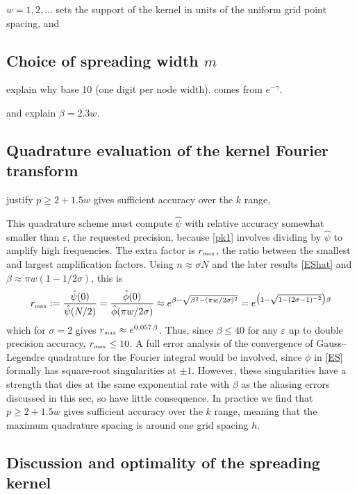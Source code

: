 \documentclass[10pt]{article}
\newcommand{\tbox}[1]{{\mbox{\tiny #1}}}
\newcommand{\eps}{\varepsilon}
\newcommand{\freq}{\beta}          %
\newcommand{\rat}{\sigma}          %
\newcommand{\rmax}{r_\tbox{max}}    %
\begin{document}
$w=1,2,\ldots$
sets the support of the kernel in units of the uniform grid point spacing, and


\subsection{Choice of spreading width $m$}
\label{s:w}

explain why base 10 (one digit per node width).
comes from $e^{-\gamma}$.

and explain $\beta = 2.3 w$.


\subsection{Quadrature evaluation of the kernel Fourier transform}
\label{s:p}

justify  $p\ge 2+1.5 w$ gives sufficient accuracy
over the $k$ range,

This quadrature scheme must compute $\hat\psi$
with relative accuracy
somewhat smaller than $\eps$, the requested precision,
because \eqref{pk1} involves dividing by $\hat\psi$ to amplify
high frequencies.
The extra factor is $\rmax$, the ratio between the smallest and largest
amplification factors. Using $n\approx \rat N$ and
the later results \eqref{EShat} and $\beta \approx \pi w( 1- 1/2\rat)$,
this is
$$
\rmax := \frac{\hat\psi(0)}{\hat\psi(N/2)}
= \frac{\hat\phi(0)}{\hat\phi(\pi w/2\rat)}
\approx e^{\freq - \sqrt{\freq^2 - (\pi w/2\rat)^2}}
= e^{\bigl(1 - \sqrt{1-(2\rat-1)^{-2}}\bigr)\freq}
$$
which for $\rat=2$ gives $\rmax \approx e^{0.057\,\freq}$.
Thus, since $\beta\le40$ for any $\eps$
up to double precision accuracy, $\rmax\le 10$.
A full error analysis of the convergence of Gauss--Legendre quadrature
for the Fourier integral would be involved, since $\phi$ in \eqref{ES}
formally has square-root singularities at $\pm 1$.
However, these singularities have a strength that dies at the same
exponential rate with $\freq$
as the aliasing errors discussed in this sec, so have
little consequence.
In practice we find that $p\ge 2+1.5 w$ gives sufficient accuracy
over the $k$ range,
meaning that the maximum quadrature spacing is around one
grid spacing $h$.






\subsection{Discussion and optimality of the spreading kernel}
\end{document}
